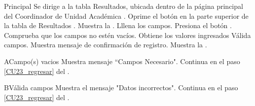     \begin{UCtrayectoria}{Principal}
    \UCpaso[\UCactor] Se dirige a la tabla Resultados, ubicada dentro de la página principal del Coordinador de Unidad Académica .
    \UCpaso[\UCactor] Oprime el botón  en la parte superior de la tabla de Resultados .
    \UCpaso Muestra la . 
    \UCpaso[\UCactor] Lllena los campos. \label{CU23_regresar}  
    \UCpaso[\UCactor] Presiona el botón .
    \UCpaso Comprueba que los campos no estén vacíos. 
    \UCpaso Obtiene los valores ingresados
    \UCpaso Válida campos. 
    \UCpaso Muestra mensaje de confirmación de registro.
    \UCpaso Muestra la .
\end{UCtrayectoria}

\begin{UCtrayectoriaA}{A}{Campo(s) vacios}
	\UCpaso Muestra mensaje “Campos Necesario".
	\UCpaso Continua en el paso \ref{CU23_regresar} del .
\end{UCtrayectoriaA}

\begin{UCtrayectoriaA}{B}{Válida campos}
	\UCpaso Muestra el mensaje "Datos incorrectos".
	\UCpaso Continua en el paso \ref{CU23_regresar} del .
\end{UCtrayectoriaA}


	



